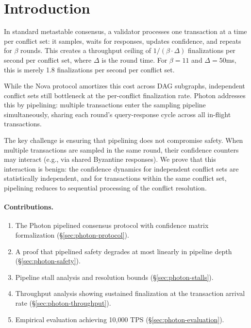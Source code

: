 \section{Introduction}

\label{sec:photon-introduction}

In standard metastable consensus, a validator processes one transaction at a time per
conflict set: it samples, waits for responses, updates confidence, and repeats for
$\beta$ rounds. This creates a throughput ceiling of $1/(\beta \cdot \Delta)$ finalizations
per second per conflict set, where $\Delta$ is the round time. For $\beta = 11$ and
$\Delta = 50$ms, this is merely 1.8 finalizations per second per conflict set.

While the Nova protocol amortizes this cost across DAG subgraphs, independent conflict
sets still bottleneck at the per-conflict finalization rate. Photon addresses this by
pipelining: multiple transactions enter the sampling pipeline simultaneously, sharing
each round's query-response cycle across all in-flight transactions.

The key challenge is ensuring that pipelining does not compromise safety. When multiple
transactions are sampled in the same round, their confidence counters may interact
(e.g., via shared Byzantine responses). We prove that this interaction is benign: the
confidence dynamics for independent conflict sets are statistically independent, and
for transactions within the same conflict set, pipelining reduces to sequential processing
of the conflict resolution.

\paragraph{Contributions.}
\begin{enumerate}[nosep]
\item The Photon pipelined consensus protocol with confidence matrix formalization (\S\ref{sec:photon-protocol}).
\item A proof that pipelined safety degrades at most linearly in pipeline depth (\S\ref{sec:photon-safety}).
\item Pipeline stall analysis and resolution bounds (\S\ref{sec:photon-stalls}).
\item Throughput analysis showing sustained finalization at the transaction arrival rate (\S\ref{sec:photon-throughput}).
\item Empirical evaluation achieving 10,000 TPS (\S\ref{sec:photon-evaluation}).
\end{enumerate}

